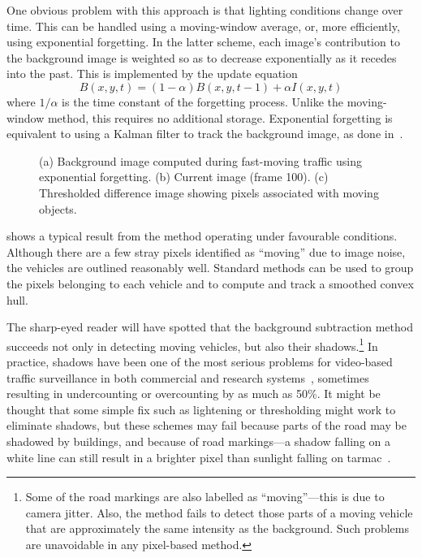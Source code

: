 One obvious problem with this approach is that lighting conditions
change over time. This can be handled using a moving-window average,
or, more efficiently, using exponential forgetting. In the latter
scheme, each image's contribution to the background image is weighted
so as to decrease exponentially as it recedes into the past. This is
implemented by the update equation
\begin{equation}
B(x,y,t) = (1-\alpha)B(x,y,t-1) + \alpha I(x,y,t)
\label{forgetting-equation}
\end{equation}
where $1/\alpha$ is the time constant of the forgetting process.
Unlike the moving-window method, this requires no additional storage.
Exponential forgetting is equivalent to using a Kalman filter to track
the background image, as done in~\cite{Koller+al:1994}.




\begin{figure*}[t]
\caption{(a) Background image computed during fast-moving traffic
using exponential forgetting. (b) Current image (frame 100). (c) Thresholded
difference image showing pixels associated with moving objects.}
\label{fast-traffic-figure}
\end{figure*}

 shows a typical result from the method
operating under favourable conditions. Although there are a few stray
pixels identified as ``moving'' due to image noise, the vehicles are
outlined reasonably well. Standard methods can be used to group the
pixels belonging to each vehicle and to compute and track a smoothed
convex hull.

The sharp-eyed reader will have spotted that the background
subtraction method succeeds not only in detecting moving vehicles, but
also their shadows.\footnote{Some of the road markings are also
labelled as ``moving''---this is due to camera jitter.
Also, the method fails to detect those parts of a moving vehicle that
are approximately the same intensity as the background.
Such problems are unavoidable in any pixel-based method.}
In practice, shadows have been one of the most
serious problems for video-based traffic surveillance in both
commercial and research systems~\cite{Michalopoulos:1991}, sometimes
resulting in undercounting or overcounting by as much as 50\%.  It
might be thought that some simple fix such as lightening or
thresholding might work to eliminate shadows, but these schemes may fail
because parts of the road may be shadowed by buildings, and because of
road markings---a shadow falling on a white line can still result in a
brighter pixel than sunlight falling on tarmac~\cite{Kilger:1992}.

